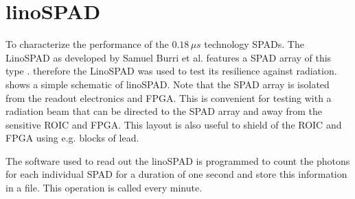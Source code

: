 \section{linoSPAD}\label{ssec:linoSPAD}
To characterize the performance of the $0.18\,\mu s$ technology SPADs. The LinoSPAD as developed by Samuel Burri et al. features a SPAD array of this type \cite{burri2016linospad}. therefore the LinoSPAD was used to test its resilience against radiation.  shows a simple schematic of linoSPAD. Note that the SPAD array is isolated from the readout electronics and FPGA. This is convenient for testing with a radiation beam that can be directed to the SPAD array and away from the sensitive ROIC and FPGA. This layout is also useful to shield of the ROIC and FPGA using e.g. blocks of lead.



The software used to read out the linoSPAD is programmed to count the photons for each individual SPAD for a duration of one second and store this information in a file. This operation is called every minute.
